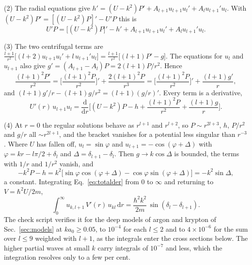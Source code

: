 \documentclass[11pt]{article}
\numberwithin{equation}{section}
\newcommand{\dd}{\mathrm d}
\begin{document}
{\noindent}(2) The radial equations give
$h'=(U-k^2)P'+A_{l+1}u_{l+1}u_l'+A_lu_{l+1}'u_l$. With
$(U-k^2)P'=[(U-k^2)P]'-U'P$ this is
\begin{equation}
U'P=\big[(U-k^2)P\big]'-h'+A_{l+1}u_{l+1}u_l'+A_lu_{l+1}'u_l .
\end{equation}

{\noindent}(3) The two centrifugal terms are
$\frac{l+1}{r^2}\big[(l+2)u_{l+1}u_l'+l\,u_{l+1}'u_l\big]
=\frac{l+1}{r^2}\big[(l+1)P'-g\big]$.
The equations for $u_l$ and $u_{l+1}$ also give $g'=(A_{l+1}-A_l)P=2(l+1)P/r^2$.
Hence
\begin{equation}
\frac{(l+1)^2P'}{r^2}=\Big[\frac{(l+1)^2P}{r^2}\Big]'+\frac{2(l+1)^2P}{r^3}
=\Big[\frac{(l+1)^2P}{r^2}\Big]'+\frac{(l+1)g'}{r},
\end{equation}
and $(l+1)g'/r-(l+1)g/r^2=(l+1)(g/r)'$. Every term is a derivative,
\begin{equation}
U'(r)\,u_{l+1}u_l=\frac{\dd}{\dd r}\Big[(U-k^2)P-h+\frac{(l+1)^2P}{r^2}+\frac{(l+1)g}{r}\Big].
\label{eq:totalder}
\end{equation}

{\noindent}(4) At $r=0$ the regular solutions behave as $r^{l+1}$ and $r^{l+2}$,
so $P\sim r^{2l+3}$, $h$, $P/r^2$ and $g/r$ all $\sim r^{2l+1}$, and the
bracket vanishes for a potential less singular than $r^{-3}$. Where $U$ has
fallen off, $u_l=\sin\varphi$ and $u_{l+1}=-\cos(\varphi+\Delta)$ with
$\varphi=kr-l\pi/2+\delta_l$ and $\Delta=\delta_{l+1}-\delta_l$. Then $g\to
k\cos\Delta$ is bounded, the terms with $1/r$ and $1/r^2$ vanish, and
\begin{equation}
-k^2P-h=k^2\big[\sin\varphi\cos(\varphi+\Delta)-\cos\varphi\sin(\varphi+\Delta)\big]
=-k^2\sin\Delta,
\end{equation}
a constant. Integrating Eq.~\eqref{eq:totalder} from 0 to $\infty$ and
returning to $V=\hbar^2U/2m$,
\begin{equation}
\boxed{\;\int_0^\infty u_{k,l+1}\,V'(r)\,u_{kl}\,\dd r=\frac{\hbar^2k^2}{2m}\,
\sin(\delta_l-\delta_{l+1}).\;}
\label{eq:force}
\end{equation}
The check script verifies it for the deep models of argon and krypton of
Sec.~\ref{sec:models} at $ka_0\ge0.05$, to $10^{-4}$ for each $l\le2$ and to
$4\times10^{-6}$ for the sum over $l\le9$ weighted with $l+1$, as the integrals
enter the cross sections below. The higher partial waves at small $k$ carry
integrals of $10^{-7}$ and less, which the integration resolves only to a few
per cent.
\end{document}
